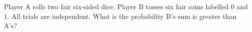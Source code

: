 Player A rolls two fair six-sided dice. Player B tosses six fair coins labelled $0$ and $1$. All trials are independent. What is the probability B's sum is greater than A's?
